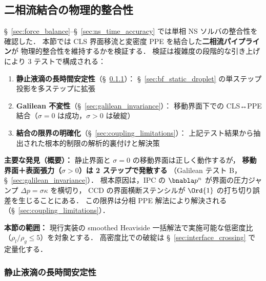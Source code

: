 %
\subsection{二相流結合の物理的整合性}
\label{sec:advection_pressure_coupling}

§~\ref{sec:force_balance}--§~\ref{sec:ns_time_accuracy} では単相 NS ソルバの整合性を確認した．
本節では CLS 界面移流と変密度 PPE を結合した\textbf{二相流パイプライン}が
物理的整合性を維持するかを検証する．
検証は複雑度の段階的な引き上げにより 3 テストで構成される：
\begin{enumerate}[noitemsep]
  \item \textbf{静止液滴の長時間安定性}（§~\ref{sec:twophase_static_longterm}）：
        §~\ref{sec:bf_static_droplet} の単ステップ投影を多ステップに拡張
  \item \textbf{Galilean 不変性}（§~\ref{sec:galilean_invariance}）：
        移動界面下での CLS↔PPE 結合（$\sigma = 0$ は成功，$\sigma > 0$ は破綻）
  \item \textbf{結合の限界の明確化}（§~\ref{sec:coupling_limitations}）：
        上記テスト結果から抽出された根本的制限の解析的裏付けと解決策
\end{enumerate}

\noindent\textbf{主要な発見（概要）：}
静止界面と $\sigma = 0$ の移動界面は正しく動作するが，
\textbf{移動界面＋表面張力（$\sigma > 0$）は 2 ステップで発散する}
（Galilean テスト B，§~\ref{sec:galilean_invariance}）．
根本原因は，IPC の $\bnabla p^n$ が界面の圧力ジャンプ $\Delta p = \sigma\kappa$ を横切り，
CCD の界面横断ステンシルが $\Ord{1}$ の打ち切り誤差を生じることにある．
この限界は分相 PPE 解法により解決される（§~\ref{sec:coupling_limitations}）．

\noindent\textbf{本節の範囲：}
現行実装の smoothed Heaviside 一括解法で実施可能な低密度比
（$\rho_l/\rho_g \leq 5$）を対象とする．
高密度比での破綻は §~\ref{sec:interface_crossing} で定量化する．

\subsubsection{静止液滴の長時間安定性}
\label{sec:twophase_static_longterm}

